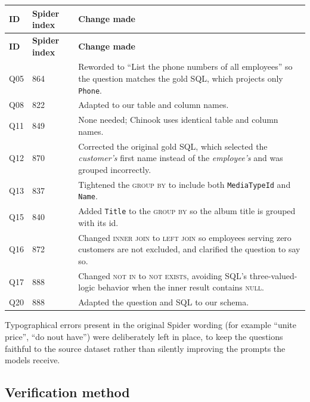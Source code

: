 \documentclass[11pt]{article}
\begin{document}
\begin{center}
\begin{longtable}{@{}llp{9.2cm}@{}}
\toprule
\textbf{ID} & \textbf{Spider index} & \textbf{Change made} \\
\midrule
\endfirsthead
\toprule
\textbf{ID} & \textbf{Spider index} & \textbf{Change made} \\
\midrule
\endhead
Q05 & 864 & Reworded to ``List the phone numbers of all employees'' so the question matches the
            gold SQL, which projects only \texttt{Phone}. \\
Q08 & 822 & Adapted to our table and column names. \\
Q11 & 849 & None needed; Chinook uses identical table and column names. \\
Q12 & 870 & Corrected the original gold SQL, which selected the \emph{customer's} first name
            instead of the \emph{employee's} and was grouped incorrectly. \\
Q13 & 837 & Tightened the \textsc{group by} to include both \texttt{MediaTypeId} and
            \texttt{Name}. \\
Q15 & 840 & Added \texttt{Title} to the \textsc{group by} so the album title is grouped with its
            id. \\
Q16 & 872 & Changed \textsc{inner join} to \textsc{left join} so employees serving zero
            customers are not excluded, and clarified the question to say so. \\
Q17 & 888 & Changed \textsc{not in} to \textsc{not exists}, avoiding SQL's three-valued-logic
            behavior when the inner result contains \textsc{null}. \\
Q20 & 888 & Adapted the question and SQL to our schema. \\
\bottomrule
\end{longtable}
\end{center}

Typographical errors present in the original Spider wording (for example ``unite price'',
``do nout have'') were deliberately left in place, to keep the questions faithful to the source
dataset rather than silently improving the prompts the models receive.

\subsection{Verification method}
\end{document}
